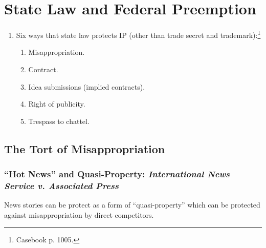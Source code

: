 \section{State Law and Federal Preemption}

\begin{enumerate}
    \item Six ways that state law protects IP (other than trade secret and 
    trademark):\footnote{Casebook p. 1005.}
    \begin{enumerate}
        \item Misappropriation.
        \item Contract.
        \item Idea submissions (implied contracts).
        \item Right of publicity.
        \item Trespass to chattel.
    \end{enumerate}
\end{enumerate}

\subsection{The Tort of Misappropriation}

\subsubsection{``Hot News'' and Quasi-Property: \emph{International News 
Service v. Associated Press}}

News stories can be protect as a form of ``quasi-property'' which can be 
protected against misappropriation by direct competitors.

